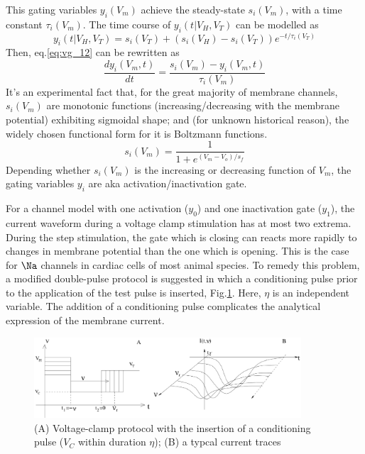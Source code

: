 This gating variables $y_i(V_m)$ achieve the steady-state $s_i(V_m)$, with a
time constant $\tau_i(V_m)$. The time course of $y_i(t|V_H,V_T)$ can be modelled
as
\begin{equation}
y_i(t|V_H,V_T) = s_i(V_T)+ \left( s_i(V_H) - s_i(V_T) \right) e^{-t/\tau_i(V_T)}
\end{equation}
Then, eq.\ref{eq:vg_12} can be rewritten as
\begin{equation}
\frac{dy_i(V_m,t)}{dt} = \frac{s_i(V_m)-y_i(V_m,t)}{\tau_i(V_m)}
\end{equation}
It's an experimental fact that, for the great majority of membrane channels,
$s_i(V_m)$ are monotonic functions (increasing/decreasing with the
membrane potential) exhibiting sigmoidal shape; and (for unknown historical
reason), the widely chosen functional form for it is Boltzmann functions.
\begin{equation}
s_i(V_m) = \frac{1}{1+e^{(V_m-V_o)/s_f}}
\end{equation}
Depending whether $s_i(V_m)$ is the increasing or decreasing function of
$V_m$, the gating variables $y_i$ are aka activation/inactivation gate.

For a channel model with one activation ($y_0$) and one inactivation gate
($y_1$), the current waveform during a voltage clamp stimulation has at most two
extrema. During the step stimulation, the gate which is closing can reacts more
rapidly to changes in membrane potential than the one which is opening. This is
the case for $\Na$ channels in cardiac cells of most animal species. To remedy
this problem, a modified double-pulse protocol is suggested in which
a conditioning pulse prior to the application of the test pulse is inserted,
Fig.\ref{fig:double_pulse_modified}. Here, $\eta$ is an independent variable.
The addition of a conditioning pulse complicates the analytical expression of
the membrane current.

\begin{figure}[hbt]
  \centerline{\includegraphics[height=3cm,
  angle=0]{./images/double_pulse_protocol_modified.eps}}
  \caption{ (A) Voltage-clamp protocol with the insertion of a conditioning
  pulse ($V_C$ within duration $\eta$); (B) a typcal current traces \citep{wang2004pe}}
  \label{fig:double_pulse_modified}
\end{figure}



